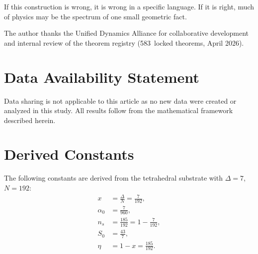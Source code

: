 \documentclass[%
 aip,
 amsmath,amssymb,
 reprint,%
]{revtex4-1}
\begin{document}
If this construction is wrong, it is wrong in a specific language. If it is right, much of physics may be the spectrum of one small geometric fact.


\begin{acknowledgments}
The author thanks the Unified Dynamics Alliance for collaborative development and internal review of the theorem registry (583~locked theorems, April 2026).
\end{acknowledgments}


\section*{Data Availability Statement}

Data sharing is not applicable to this article as no new data were created or analyzed in this study. All results follow from the mathematical framework described herein.


\appendix

\section{\label{app:constants}Derived Constants}

The following constants are derived from the tetrahedral substrate with $\Delta=7$, $N=192$:
\begin{align}
x &= \frac{\Delta}{N}=\frac{7}{192}, \label{eq:x}\\
\alpha_0 &= \frac{7}{960}, \label{eq:alpha0}\\
n_s &= \frac{185}{192}=1-\frac{7}{192}, \label{eq:ns}\\
S_0 &= \frac{43}{7}, \label{eq:S0}\\
\eta &= 1-x = \frac{185}{192}. \label{eq:eta_app}
\end{align}


\nocite{*}
\end{document}
